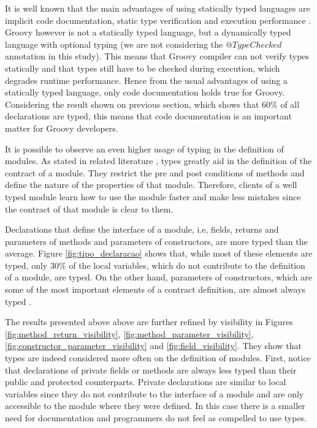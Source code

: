 \documentclass[preprint]{sigplanconf}
\begin{document}
It is well known that the main advantages of using statically typed languages are implicit code documentation, static type verification and execution performance \cite{type_systems,mayer2012static}.
Groovy however is not a statically typed language, but a dynamically typed language with optional typing (we are not considering the $@TypeChecked$ annotation in this study).
This means that Groovy compiler can not verify types statically and that types still have to be checked during execution, which degrades runtime performance.
Hence from the usual advantages of using a statically typed language, only code documentation holds true for Groovy.
Considering the result shown on previous section, which shows that 60\% of all declarations are typed, this means that code documentation is an important matter for Groovy developers.

It is possible to observe an even higher usage of typing in the definition of modules.
As stated in related literature \cite{Meyer88, Meijer04, Wadler04, Plosch97, Flanagan2006, Furr09}, types greatly aid in the definition of the contract of a module.
They restrict the pre and post conditions of methods and define the nature of the properties of that module.
Therefore, clients of a well typed module learn how to use the module faster and make less mistakes since the contract of that module is clear to them.

Declarations that define the interface of a module, i.e, fields, returns and parameters of methods and parameters of constructors, are more typed than the average.
Figure \ref{fig:tipo_declaracao} shows that, while most of these elements are typed, only 30\%  of the local variables, which do not contribute to the definition of a module, are typed. On the other hand, parameters of constructors, which are some of the most important elements of a contract definition, are almost always typed \cite{Meijer04}. 

The results presented above above are further refined by visibility in Figures \ref{fig:method_return_visibility}, \ref{fig:method_parameter_visibility}, \ref{fig:constructor_parameter_visibility} and \ref{fig:field_visibility}.
They show that types are indeed considered more often on the definition of modules.
First, notice that declarations of private fields or methods are always less typed than their public and protected counterparts.
Private declarations are similar to local variables since they do not contribute to the interface of a module and are only accessible to the module where they were defined.
In this case there is a smaller need for documentation and programmers do not feel as compelled to use types.
\end{document}
